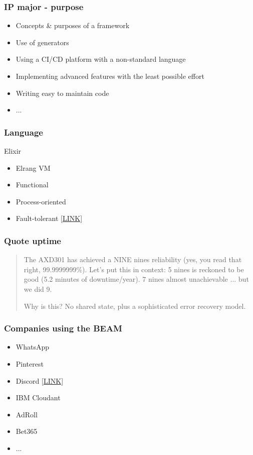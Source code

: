 \documentclass{beamer}
\begin{document}
\begin{frame}
    \frametitle{IP major - purpose}

    \begin{itemize}
        \item Concepts \& purposes of a framework
        \item Use of generators
        \item Using a CI/CD platform with a non-standard language
        \item Implementing advanced features with the least possible effort
        \item Writing easy to maintain code
        \item ...
    \end{itemize}

\end{frame}

\begin{frame}
    \frametitle{Language}

    Elixir
    \begin{itemize}
        \item Elrang VM
        \item Functional
        \item Process-oriented
        \item Fault-tolerant \href{https://stackoverflow.com/questions/8426897/erlangs-99-9999999-nine-nines-reliability}{[LINK]}
    \end{itemize}

\end{frame}

\begin{frame}
    \frametitle{Quote uptime}

    \begin{quote}
        

    The AXD301 has achieved a NINE nines reliability (yes, you read that right, 
    99.9999999\%). Let’s put this in context: 5 nines is reckoned to be good (5.2 minutes of downtime/year). 7 nines almost unachievable ... but we did 9.

    Why is this? No shared state, plus a sophisticated error recovery model.

    \end{quote}

\end{frame}

\begin{frame}
    \frametitle{Companies using the BEAM}

    \begin{itemize}
        \item WhatsApp
        \item Pinterest
        \item Discord \href{https://blog.discordapp.com/how-discord-handles-two-and-half-million-concurrent-voice-users-using-webrtc-ce01c3187429}{[LINK]}
        \item IBM Cloudant
        \item AdRoll
        \item Bet365
        \item ...
    \end{itemize}

\end{frame}
\end{document}
